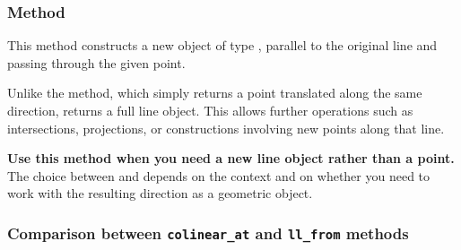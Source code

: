 \subsubsection{Method } %
\label{ssub_line_from_a_defined_line}

This method constructs a new object of type , parallel to the original line and passing through the given point.

\medskip
\noindent
Unlike the  method, which simply returns a point translated along the same direction,  returns a full line object. This allows further operations such as intersections, projections, or constructions involving new points along that line.

\medskip
\noindent
\textbf{Use this method when you need a new line object rather than a point.} The choice between  and  depends on the context and on whether you need to work with the resulting direction as a geometric object.

\begin{minipage}{.5\textwidth}
\begin{center}
\end{center}
\end{minipage}
\begin{minipage}{.5\textwidth}
\begin{tkzexample}
\end{tkzexample}
\end{minipage}


\subsubsection{Comparison between \texttt{colinear\_at} and \texttt{ll\_from} methods}

